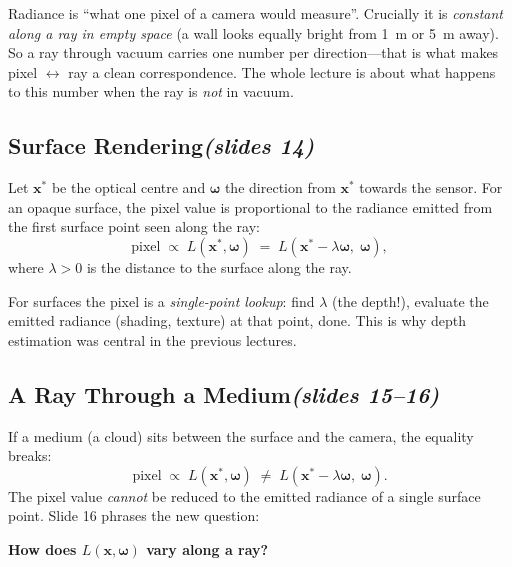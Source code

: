 \documentclass[11pt,a4paper]{article}
\newcommand{\slides}[1]{\texorpdfstring{\hfill{\normalfont\small\emph{(slides #1)}}}{ (slides #1)}}
\newcommand{\x}{\bm{x}}
\newcommand{\w}{\bm{\omega}}
\theoremstyle{remark}\newtheorem*{remark}{Remark}
\begin{document}
\begin{intuition}
Radiance is ``what one pixel of a camera would measure''. Crucially it is \emph{constant along a ray in empty space} (a wall looks equally bright from 1~m or 5~m away). So a ray through vacuum carries one number per direction---that is what makes pixel $\leftrightarrow$ ray a clean correspondence. The whole lecture is about what happens to this number when the ray is \emph{not} in vacuum.
\end{intuition}

\subsection{Surface Rendering\slides{14}}

Let $\x^*$ be the optical centre and $\w$ the direction from $\x^*$ towards the sensor. For an opaque surface, the pixel value is proportional to the radiance emitted from the first surface point seen along the ray:
\[
\text{pixel}\;\propto\;L(\x^*,\w)\;=\;L(\x^*-\lambda\w,\;\w),
\]
where $\lambda>0$ is the distance to the surface along the ray.

\begin{intuition}
For surfaces the pixel is a \emph{single-point lookup}: find $\lambda$ (the depth!), evaluate the emitted radiance (shading, texture) at that point, done. This is why depth estimation was central in the previous lectures.
\end{intuition}

\subsection{A Ray Through a Medium\slides{15--16}}

If a medium (a cloud) sits between the surface and the camera, the equality breaks:
\[
\text{pixel}\;\propto\;L(\x^*,\w)\;\neq\;L(\x^*-\lambda\w,\;\w).
\]
The pixel value \emph{cannot} be reduced to the emitted radiance of a single surface point. Slide 16 phrases the new question:

\begin{center}\textbf{How does $L(\x,\w)$ vary along a ray?}\end{center}
\end{document}

